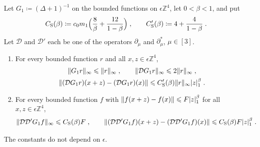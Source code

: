 \documentclass[11pt]{preprint}
\DeclarePairedDelimiter{\abs}{\lvert}{\rvert}
\DeclarePairedDelimiter{\norm}{\lVert}{\rVert}
\numberwithin{equation}{section}
\begin{document}
\begin{proposition}\label{prop:free-schauder}
Let $G_1 \coloneqq (\Delta + 1)^{-1}$ on the bounded functions on $\epsilon\mathbb Z^4$, let $0 < \beta < 1$, and put
\begin{equation}\label{eq:schauder-constants}
    C_{\mathrm S}(\beta) \coloneqq c_0m_1\Bigl(\frac{8}{\beta} + \frac{12}{1 - \beta}\Bigr)\;,
    \qquad
    C'_{\mathrm S}(\beta) \coloneqq 4 + \frac{4}{1 - \beta}\;.
\end{equation}
Let $\mathcal D$ and $\mathcal D'$ each be one of the operators $\partial_\mu$ and $\partial^*_\mu$, $\mu \in [3]$.
\begin{enumerate}[label=(\roman*)]
\item For every bounded function $r$ and all $x, z \in \epsilon\mathbb Z^4$,
\begin{equation}\label{eq:free-first}
\begin{gathered}
    \norm{G_1r}_\infty \leqslant \norm r_\infty\;,
    \qquad
    \norm{\mathcal DG_1r}_\infty \leqslant 2\norm r_\infty\;,\\
    \norm{(\mathcal DG_1r)(x + z) - (\mathcal DG_1r)(x)} \leqslant C'_{\mathrm S}(\beta)\norm r_\infty\abs z_1^\beta\;.
\end{gathered}
\end{equation}
\item For every bounded function $f$ with $\norm{f(x + z) - f(x)} \leqslant F\abs z_1^\beta$ for all $x, z \in \epsilon\mathbb Z^4$,
\begin{equation}\label{eq:free-second}
    \norm{\mathcal D\mathcal D'G_1f}_\infty \leqslant C_{\mathrm S}(\beta)F\;,
    \qquad
    \norm{(\mathcal D\mathcal D'G_1f)(x + z) - (\mathcal D\mathcal D'G_1f)(x)} \leqslant C_{\mathrm S}(\beta)F\abs z_1^\beta\;.
\end{equation}
\end{enumerate}
The constants do not depend on $\epsilon$.
\end{proposition}
\end{document}
